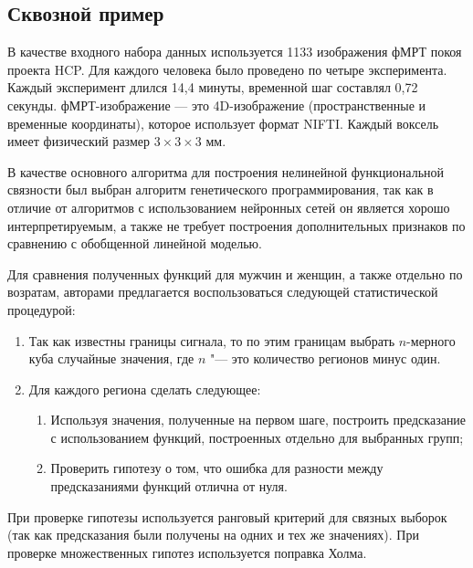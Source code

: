 \subsection{Сквозной пример}
В качестве входного набора данных используется 1133 изображения фМРТ покоя проекта HCP. Для каждого человека 
было проведено по четыре эксперимента. Каждый эксперимент длился 14,4 минуты, временной шаг составлял 0,72 секунды. 
фМРТ-изображение — это 4D-изображение (пространственные и временные координаты), которое использует формат NIFTI. 
Каждый воксель имеет физический размер $3\times 3 \times 3$ мм.

В качестве основного алгоритма для построения нелинейной функциональной связности был 
выбран алгоритм генетического программирования, так как в отличие от алгоритмов с использованием нейронных сетей он 
является хорошо интерпретируемым, а также не требует построения дополнительных признаков 
по сравнению с обобщенной линейной моделью.


Для сравнения полученных функций для мужчин и женщин, а также отдельно по возратам, 
авторами предлагается воспользоваться следующей статистической процедурой:

\begin{enumerate}
    \item Так как известны границы сигнала, то по этим границам выбрать $n$-мерного куба 
            случайные значения, где $n$ "--- это количество регионов минус один.
    \item Для каждого региона сделать следующее:
    \begin{enumerate}
        \item Используя значения, полученные на первом шаге, построить предсказание с использованием функций, 
                построенных отдельно для выбранных групп;
        \item Проверить гипотезу о том, что ошибка для разности между предсказаниями функций отлична от нуля.
    \end{enumerate}
\end{enumerate}

При проверке гипотезы используется ранговый критерий для связных выборок (так как предсказания были получены 
на одних и тех же значениях). При проверке множественных гипотез используется поправка Холма.



